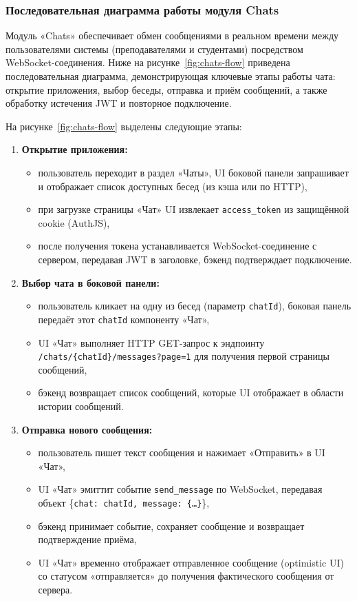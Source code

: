 \subsubsection{Последовательная диаграмма работы модуля Chats}
Модуль «Chats» обеспечивает обмен сообщениями в реальном времени между пользователями системы (преподавателями и студентами) посредством WebSocket-соединения. Ниже на рисунке~\ref{fig:chats-flow} приведена последовательная диаграмма, демонстрирующая ключевые этапы работы чата: открытие приложения, выбор беседы, отправка и приём сообщений, а также обработку истечения JWT и повторное подключение.

На рисунке~\ref{fig:chats-flow} выделены следующие этапы:

\begin{enumerate}
    \item \textbf{Открытие приложения:}
    \begin{itemize}
        \item пользователь переходит в раздел «Чаты», UI боковой панели запрашивает и отображает список доступных бесед (из кэша или по HTTP),
        \item при загрузке страницы «Чат» UI извлекает \texttt{access\_token} из защищённой cookie (AuthJS),
        \item после получения токена устанавливается WebSocket-соединение с сервером, передавая JWT в заголовке, бэкенд подтверждает подключение.
    \end{itemize}

    \item \textbf{Выбор чата в боковой панели:}
    \begin{itemize}
        \item пользователь кликает на одну из бесед (параметр \texttt{chatId}), боковая панель передаёт этот \texttt{chatId} компоненту «Чат»,
        \item UI «Чат» выполняет HTTP GET-запрос к эндпоинту \texttt{/chats/\{chatId\}/messages?page=1} для получения первой страницы сообщений,
        \item бэкенд возвращает список сообщений, которые UI отображает в области истории сообщений.
    \end{itemize}

    \item \textbf{Отправка нового сообщения:}
    \begin{itemize}
        \item пользователь пишет текст сообщения и нажимает «Отправить» в UI «Чат»,
        \item UI «Чат» эмиттит событие \texttt{send\_message} по WebSocket, передавая объект \{\texttt{chat: chatId, message: \{\ldots\}}\},
        \item бэкенд принимает событие, сохраняет сообщение и возвращает подтверждение приёма,
        \item UI «Чат» временно отображает отправленное сообщение (optimistic UI) со статусом «отправляется» до получения фактического сообщения от сервера.
    \end{itemize}


\end{enumerate}
